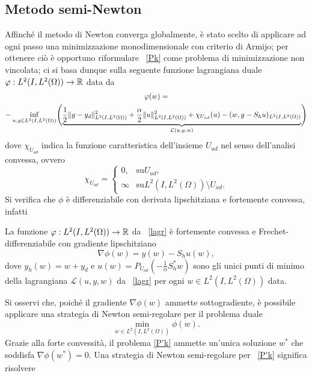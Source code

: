 \subsection{Metodo semi-Newton}
Affinché il metodo di Newton converga globalmente, è stato scelto di applicare ad ogni passo una minimizzazione monodimensionale con criterio di Armijo; per ottenere ciò è opportuno riformulare ~\eqref{Pk} come problema di minimizzazione non vincolata; ci si basa dunque sulla seguente funzione lagrangiana duale $ \varphi:L^2(I,L^2(\Omega))\to \mathbb{R} $ data da
\begin{multline}
\label{lagr}
\varphi(w)= \\
-\inf_{u,y\in L^2(I,L^2(\Omega))}\Biggl( \underbrace{\frac{1}{2}\lVert y-y_d\rVert^2_{L^2(I,L^2(\Omega))} + \frac{\alpha}{2}\lVert u\rVert^2_{L^2(I,L^2(\Omega))}  + \chi_{U_{ad}}(u) - (w,y-S_hu)_{L^2(I,L^2(\Omega))}}_{\mathcal{L}(u,y,w)}\Biggr)
\end{multline}
dove $ \chi_{U_{ad}} $ indica la funzione caratteristica dell'insieme $ U_{ad} $ nel senso dell'analisi convessa, ovvero
\begin{equation}
\chi_{U_{ad}}=
\begin{cases}
0,        &\text{su} U_{ad},\\
\infty   &\text{su} L^2(I,L^2(\Omega))\setminus U_{ad}.
\end{cases}
\end{equation}
Si verifica che $ \phi $ è differenziabile con derivata lipschitziana e fortemente convessa, infatti
\begin{lemma}
\label{phi}
La funzione $ \varphi:L^2(I,L^2(\Omega))\to\mathbb{R} $ da ~\eqref{lagr} è fortemente convessa e Frechet-differenziabile con gradiente lipschitziano
\begin{equation}
\nabla\phi(w)=y(w)-S_hu(w),
\end{equation}
dove $ y_h(w)=w+y_d $ e $ u(w)=P_{U_{ad}}(-\frac{1}{\alpha}S^*_hw) $ sono gli unici punti di minimo della lagrangiana $ \mathcal{L}(u,y,w) $ da ~\eqref{lagr} per ogni $ w\in L^2(I,L^2(\Omega)) $ data.
\end{lemma}
Si osservi che, poiché il gradiente $ \nabla\phi(w) $ ammette sottogradiente, è possibile applicare una strategia di Newton semi-regolare per il problema duale 
\begin{equation}
\label{P'k}
\min_{w\in L^2(I,L^2(\Omega))} \phi(w).
\end{equation}
Grazie alla forte convessità, il problema \eqref{P'k} ammette un'unica soluzione $ w^* $ che soddisfa $ \nabla\phi(w^*)=0 $.
Una strategia di Newton semi-regolare per ~\eqref{P'k} significa risolvere 
